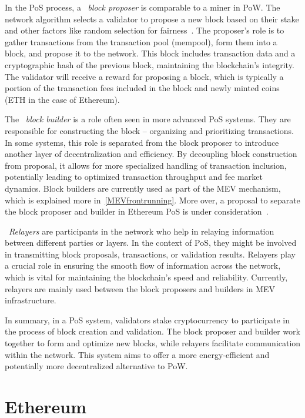 In the PoS process, a ~\textit{block proposer} is comparable to a miner in PoW. The network algorithm selects a validator to propose a new block based on their stake and other factors like random selection for fairness~\cite{ethereumrandao}. The proposer's role is to gather transactions from the transaction pool (mempool), form them into a block, and propose it to the network. This block includes transaction data and a cryptographic hash of the previous block, maintaining the blockchain's integrity. The validator will receive a reward for proposing a block, which is typically a portion of the transaction fees included in the block and newly minted coins (ETH in the case of Ethereum).

The ~\textit{block builder} is a role often seen in more advanced PoS systems. They are responsible for constructing the block – organizing and prioritizing transactions. In some systems, this role is separated from the block proposer to introduce another layer of decentralization and efficiency. By decoupling block construction from proposal, it allows for more specialized handling of transaction inclusion, potentially leading to optimized transaction throughput and fee market dynamics. Block builders are currently used as part of the MEV mechanism, which is explained more in~\ref{MEVfrontrunning}. More over, a proposal to separate the block proposer and builder in Ethereum PoS is under consideration~\cite{ethereumPBS}.

~\textit{Relayers} are participants in the network who help in relaying information between different parties or layers. In the context of PoS, they might be involved in transmitting block proposals, transactions, or validation results. Relayers play a crucial role in ensuring the smooth flow of information across the network, which is vital for maintaining the blockchain's speed and reliability. Currently, relayers are mainly used between the block proposers and builders in MEV infrastructure.

In summary, in a PoS system, validators stake cryptocurrency to participate in the process of block creation and validation. The block proposer and builder work together to form and optimize new blocks, while relayers facilitate communication within the network. This system aims to offer a more energy-efficient and potentially more decentralized alternative to PoW.




\section{Ethereum}

